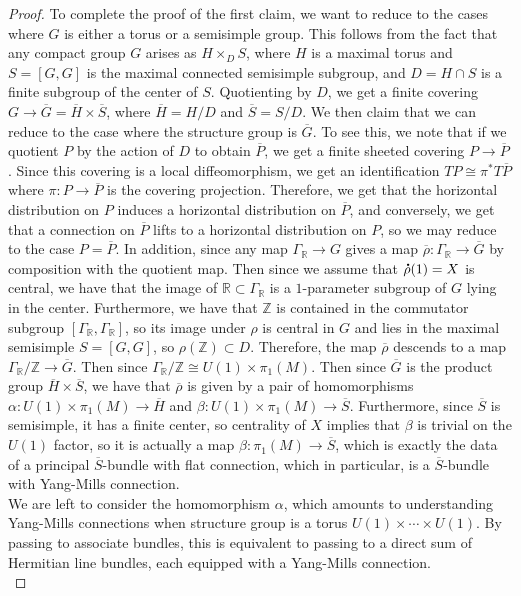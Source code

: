 \documentclass[psamsfonts, 12pt]{amsart}
\theoremstyle{definition}
\theoremstyle{remark}
\newcommand{\R}{\mathbb{R}}
\newcommand{\Z}{\mathbb{Z}}
\newcommand*{\dt}[1]{%
   \accentset{\mbox{\large\bfseries .}}{#1}}
\begin{document}
\begin{proof}
To complete the proof of the first claim, we want to reduce to the cases where
$G$ is either a torus or a semisimple group. This follows from the fact
that any compact group $G$ arises as $H \times_D S$, where $H$ is a maximal torus
and $S = [G,G]$ is the maximal connected semisimple subgroup, and $D = H \cap S$ is
a finite subgroup of the center of $S$. Quotienting by $D$, we get a finite covering
$G \to \overline{G} = \overline{H} \times \overline{S}$, where
$\overline{H} = H/D$ and $\overline{S} = S/D$. We then claim that we can reduce to
the case where the structure group is $\overline{G}$. To see this, we note that
if we quotient $P$ by the action of $D$ to obtain $\overline{P}$, we get a finite
sheeted covering $P \to \overline{P}$. Since this covering is a local diffeomorphism,
we get an identification $TP \cong \pi^*T\overline{P}$ where $\pi : P \to \overline{P}$
is the covering projection. Therefore, we get that the horizontal distribution on
$P$ induces a horizontal distribution on $\overline{P}$, and conversely, we get
that a connection on $\overline{P}$ lifts to a horizontal distribution on $P$, so we
may reduce to the case $P = \overline{P}$. In addition, since any map
$\Gamma_\R \to G$ gives a map $\overline{\rho} : \Gamma_\R \to \overline{G}$ by
composition with the quotient map. Then since we assume that $\dt{\rho}(1) = X$ is
central, we have that the image of $\R \subset \Gamma_\R$ is a $1$-parameter subgroup
of $G$ lying in the center. Furthermore, we have that $\Z$ is contained in the commutator
subgroup $[\Gamma_\R,\Gamma_\R]$, so its image under $\rho$ is central in $G$ and
lies in the maximal semisimple $S = [G,G]$, so $\rho(\Z) \subset D$. Therefore, the
map $\overline{\rho}$ descends to a map $\Gamma_\R / \Z \to \overline{G}$. Then since
$\Gamma_\R / \Z \cong U(1) \times \pi_1(M)$. Then since $\overline{G}$ is the
product group $\overline{H} \times \overline{S}$, we have that $\overline{\rho}$
is given by a pair of homomorphisms $\alpha : U(1) \times \pi_1(M) \to \overline{H}$
and $\beta : U(1) \times \pi_1(M) \to \overline{S}$. Furthermore, since $\overline{S}$
is semisimple, it has a finite center, so centrality of $X$ implies that $\beta$
is trivial on the $U(1)$ factor, so it is actually a map
$\beta : \pi_1(M) \to \overline{S}$, which is exactly the data of a principal
$\overline{S}$-bundle with flat connection, which in particular, is a
$\overline{S}$-bundle with Yang-Mills connection. \\

We are left to consider the homomorphism $\alpha$, which amounts to understanding
Yang-Mills connections when structure group is a torus $U(1) \times \cdots \times U(1)$.
By passing to associate bundles, this is equivalent to passing to a direct sum
of Hermitian line bundles, each equipped with a Yang-Mills connection. \\


\end{proof}
\end{document}
